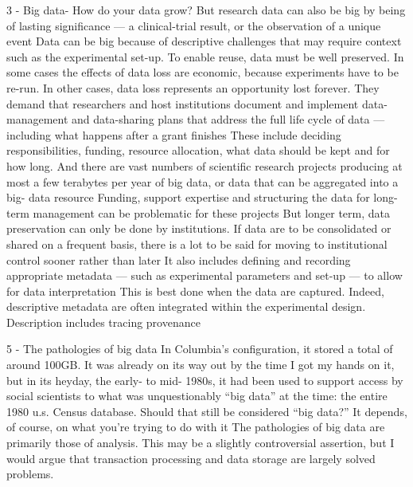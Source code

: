3 - Big data- How do your data grow?
But research data can also be big by being of lasting significance — a clinical-trial result, or the observation of a unique event
Data can be big because of descriptive challenges that may require context such as the experimental set-up.
To enable reuse, data must be well preserved. In some cases the effects of data loss are economic, because experiments have to be re-run. In other cases, data loss represents an opportunity lost forever.
They demand that researchers and host institutions document and implement data-management and data-sharing plans that address the full life cycle of data — including what happens after a grant finishes
These include deciding responsibilities, funding, resource allocation, what data should be kept and for how long.
And there are vast numbers of scientific research projects producing at most a few terabytes per year of big data, or data that can be aggregated into a big- data resource
Funding, support expertise and structuring the data for long-term management can be problematic for these projects
But longer term, data preservation can only be done by institutions. If data are to be consolidated or shared on a frequent basis, there is a lot to be said for moving to institutional control sooner rather than later
 It also includes defining and recording appropriate metadata — such as experimental parameters and set-up — to allow for data interpretation
 This is best done when the data are captured. Indeed, descriptive metadata are often integrated within the experimental design. Description includes tracing provenance 
 
 5 - The pathologies of big data
 In Columbia's configuration, it stored a total of around 100GB. It was already on its way out by the time I got my hands on it, but in its heyday, the early- to mid- 1980s, it had been used to support access by social scientists to what was unquestionably “big data” at the time: the entire 1980 u.s. Census database.
 Should that still be considered “big data?” It depends, of course, on what you're trying to do with it
 The pathologies of big data are primarily those of analysis. This may be a slightly controversial assertion, but I would argue that transaction processing and data storage are largely solved problems.